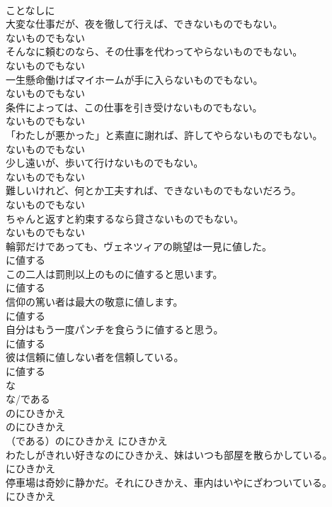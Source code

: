 \documentclass[8pt]{extreport}
\begin{document}
\begin{CJK}{UTF8}{min}
\\	ことなしに
\\	大変な仕事だが、夜を徹して行えば、できないものでもない。	
\\	ないものでもない
\\	そんなに頼むのなら、その仕事を代わってやらないものでもない。	
\\	ないものでもない
\\	一生懸命働けばマイホームが手に入らないものでもない。	
\\	ないものでもない
\\	条件によっては、この仕事を引き受けないものでもない。	
\\	ないものでもない
\\	「わたしが悪かった」と素直に謝れば、許してやらないものでもない。	
\\	ないものでもない
\\	少し遠いが、歩いて行けないものでもない。	
\\	ないものでもない
\\	難しいけれど、何とか工夫すれば、できないものでもないだろう。	
\\	ないものでもない
\\	ちゃんと返すと約束するなら貸さないものでもない。	
\\	ないものでもない
\\	輪郭だけであっても、ヴェネツィアの眺望は一見に値した。	
\\	に値する
\\	この二人は罰則以上のものに値すると思います。	
\\	に値する
\\	信仰の篤い者は最大の敬意に値します。	
\\	に値する
\\	自分はもう一度パンチを食らうに値すると思う。	
\\	に値する
\\	彼は信頼に値しない者を信頼している。	
\\	に値する
\\	な
\\	な/である 
\\	のにひきかえ	
\\	のにひきかえ	
\\	（である）のにひきかえ	にひきかえ
\\	わたしがきれい好きなのにひきかえ、妹はいつも部屋を散らかしている。	
\\	にひきかえ
\\	停車場は奇妙に静かだ。それにひきかえ、車内はいやにざわついている。	
\\	にひきかえ

\end{CJK}
\end{document}

